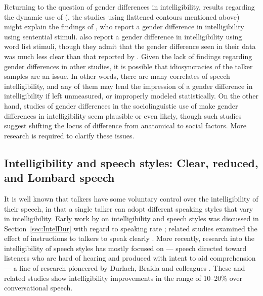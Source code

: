 Returning to the question of gender differences in intelligibility, results regarding the dynamic use of \fo{} (\ie, the studies using flattened \fo{} contours mentioned above) might explain the findings of \citet{BradlowEtAl1996}, who report a gender difference in intelligibility using sentential stimuli.  \citet{HazanMarkham2004} also report a gender difference in intelligibility using word list stimuli, though they admit that the gender difference seen in their data was much less clear than that reported by \citeauthor*{BradlowEtAl1996}.  Given the lack of findings regarding gender differences in other studies, it is possible that idiosyncracies of the talker samples are an issue.  In other words, there are many correlates of speech intelligibility, and any of them may lend the impression of a gender difference in intelligibility if left unmeasured, or improperly modeled statistically.  On the other hand, studies of gender differences in the sociolinguistic use of \fo{} make gender differences in intelligibility seem plausible or even likely, though such studies suggest shifting the locus of difference from anatomical to social factors.  More research is required to clarify these issues.


\subsection[Intelligibility and speech styles]{Intelligibility and speech styles: Clear, reduced, and Lombard speech\label{sec:SpeechStyle}}
It is well known that talkers have some voluntary control over the intelligibility of their speech, in that a single talker can adopt different speaking styles that vary in intelligibility.  Early work by \citeauthor*{Tolhurst1957a} on intelligibility and speech styles was discussed in Section~\ref{sec:IntelDur} with regard to speaking rate \citep{Tolhurst1957a}; related studies examined the effect of instructions to talkers to speak clearly \citep{Tolhurst1954, Tolhurst1955}.  More recently, research into the intelligibility of speech styles has mostly focused on  — speech directed toward listeners who are hard of hearing and produced with intent to aid comprehension — a line of research pioneered by Durlach, Braida and colleagues \citep[\eg,][]{PichenyEtAl1985, PichenyEtAl1986, PichenyEtAl1989, UchanskiEtAl1996, KrauseBraida2004}.  These and related studies show intelligibility improvements in the range of 10–20\% over conversational speech.

